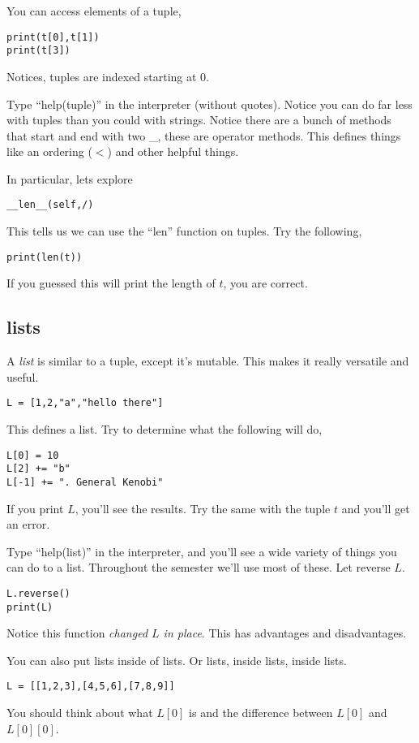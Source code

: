 \documentclass[11pt,letterpaper]{article}
\begin{document}
You can access elements of a tuple,
\begin{verbatim}
print(t[0],t[1])
print(t[3])
\end{verbatim}
Notices, tuples are indexed starting at 0.

Type ``help(tuple)'' in the interpreter (without quotes). Notice you can do far less with tuples 
than you could with strings. Notice there are a bunch of methods that start and end with two \_,
these are operator methods. This defines things like an ordering ($<$) and other helpful things.

In particular, lets explore 
\begin{verbatim}
__len__(self,/)
\end{verbatim}
This tells us we can use the ``len'' function on tuples. Try the following,
\begin{verbatim}
print(len(t))
\end{verbatim}
If you guessed this will print the length of $t$, you are correct. 

\subsection{lists}
A \emph{list} is similar to a tuple, except it's mutable. This makes it really versatile and useful.
\begin{verbatim}
L = [1,2,"a","hello there"]
\end{verbatim}
This defines a list. Try to determine what the following will do,
\begin{verbatim}
L[0] = 10
L[2] += "b"
L[-1] += ". General Kenobi"
\end{verbatim}
If you print $L$, you'll see the results. Try the same with the tuple $t$ and you'll get an error.

Type ``help(list)'' in the interpreter, and you'll see a wide variety of things you can do to a list.
Throughout the semester we'll use most of these. Let reverse $L$.
\begin{verbatim}
L.reverse()
print(L)
\end{verbatim}
Notice this function \emph{changed $L$ in place}. This has advantages and disadvantages. 

You can also put lists inside of lists. Or lists, inside lists, inside lists. 
\begin{verbatim}
L = [[1,2,3],[4,5,6],[7,8,9]]
\end{verbatim}
You should think about what $L[0]$ is and the difference between $L[0]$ and $L[0][0]$.
\end{document}
